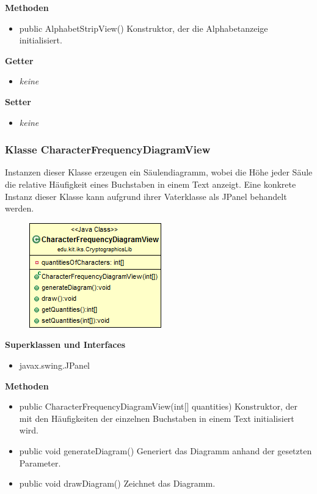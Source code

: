 \documentclass{article}
\begin{document}
      \textbf{Methoden}
      \begin{itemize}
        \item public AlphabetStripView() \newline
          Konstruktor, der die Alphabetanzeige initialisiert.
      \end{itemize}
      
      \textbf{Getter}
      \begin{itemize}
		\item \textit{keine}
      \end{itemize}
      
      \textbf{Setter}
      \begin{itemize}
        \item \textit{keine}
      \end{itemize}
	
	\subsubsection{Klasse CharacterFrequencyDiagramView}
	  Instanzen dieser Klasse erzeugen ein Säulendiagramm, wobei die
	  Höhe jeder Säule die relative Häufigkeit eines Buchstaben in einem Text anzeigt.
	  Eine konkrete Instanz dieser Klasse kann aufgrund ihrer Vaterklasse als JPanel behandelt werden.
	
      \begin{figure}[H]
        \centering
        \includegraphics{resources/edu-kit-iks-CryptographicsLib-CharacterFrequencyDiagramView}
      \end{figure}
	
      \textbf{Superklassen und Interfaces}
      \begin{itemize}
        \item javax.swing.JPanel
      \end{itemize}
	
      \textbf{Methoden}
      \begin{itemize}
        \item public CharacterFrequencyDiagramView(int[] quantities) \newline
          Konstruktor, der mit den Häufigkeiten der einzelnen Buchstaben in einem Text
          initialisiert wird.
        \item public void generateDiagram() \newline
          Generiert das Diagramm anhand der gesetzten Parameter.
        \item public void drawDiagram() \newline
          Zeichnet das Diagramm.
      \end{itemize}
      
\end{document}
